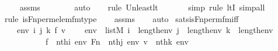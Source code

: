 \begin{isabellebody}
\ \ \isamarkupfalse%
\ assms\isanewline
\ \ \ \ \ \ \isamarkupfalse%
\ auto{\isacharbrackleft}{\kern0pt}{}{\isacharbrackright}{\kern0pt}\isanewline
\ \ \ \isamarkupfalse%
{\isacharparenleft}{\kern0pt}rule\ Un{\isacharunderscore}{\kern0pt}least{\isacharunderscore}{\kern0pt}lt{\isacharparenright}{\kern0pt}{\isacharplus}{\kern0pt}\isanewline
\ \ \ \ \ \isamarkupfalse%
\ {\isacharparenleft}{\kern0pt}simp{\isacharcomma}{\kern0pt}\ rule\ ltI{\isacharcomma}{\kern0pt}\ simp{\isacharunderscore}{\kern0pt}all{\isacharparenright}{\kern0pt}\isanewline
\ \ \isamarkupfalse%
{\isacharparenleft}{\kern0pt}rule\ is{\isacharunderscore}{\kern0pt}Fn{\isacharunderscore}{\kern0pt}perm{\isacharprime}{\kern0pt}{\isacharunderscore}{\kern0pt}elem{\isacharunderscore}{\kern0pt}fm{\isacharunderscore}{\kern0pt}type{\isacharparenright}{\kern0pt}\isanewline
\ \ \isamarkupfalse%
\ assms\isanewline
\ \ \isamarkupfalse%
\ auto%
\endisatagproof
{\isafoldproof}%
%
\isadelimproof
\isanewline
%
\endisadelimproof
\isanewline
{}\isamarkupfalse%
\ sats{\isacharunderscore}{\kern0pt}is{\isacharunderscore}{\kern0pt}Fn{\isacharunderscore}{\kern0pt}perm{\isacharprime}{\kern0pt}{\isacharunderscore}{\kern0pt}fm{\isacharunderscore}{\kern0pt}iff\ {\isacharcolon}{\kern0pt}\ \isanewline
\ \ \ env\ i\ j\ k\ f\ v\ \isanewline
\ \ \ {\isachardoublequoteopen}env\ {\isasymin}\ list{\isacharparenleft}{\kern0pt}M{\isacharparenright}{\kern0pt}{\isachardoublequoteclose}\ {\isachardoublequoteopen}i\ {\isacharless}{\kern0pt}\ length{\isacharparenleft}{\kern0pt}env{\isacharparenright}{\kern0pt}{\isachardoublequoteclose}\ {\isachardoublequoteopen}j\ {\isacharless}{\kern0pt}\ length{\isacharparenleft}{\kern0pt}env{\isacharparenright}{\kern0pt}{\isachardoublequoteclose}\ {\isachardoublequoteopen}k\ {\isacharless}{\kern0pt}\ length{\isacharparenleft}{\kern0pt}env{\isacharparenright}{\kern0pt}{\isachardoublequoteclose}\ \isanewline
\ \ \ \ \ \ \ \ \ \ {\isachardoublequoteopen}f\ {\isacharequal}{\kern0pt}\ nth{\isacharparenleft}{\kern0pt}i{\isacharcomma}{\kern0pt}\ env{\isacharparenright}{\kern0pt}{\isachardoublequoteclose}\ {\isachardoublequoteopen}Fn\ {\isacharequal}{\kern0pt}\ nth{\isacharparenleft}{\kern0pt}j{\isacharcomma}{\kern0pt}\ env{\isacharparenright}{\kern0pt}{\isachardoublequoteclose}\ {\isachardoublequoteopen}v\ {\isacharequal}{\kern0pt}\ nth{\isacharparenleft}{\kern0pt}k{\isacharcomma}{\kern0pt}\ env{\isacharparenright}{\kern0pt}{\isachardoublequoteclose}\ \isanewline

\end{isabellebody}
